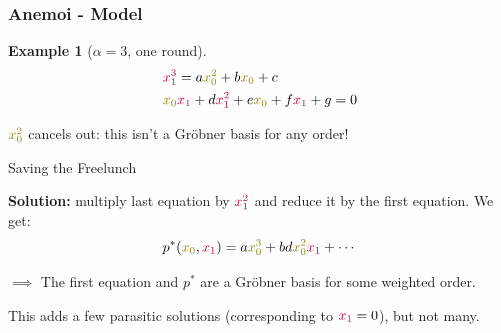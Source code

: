 \documentclass[aspectratio=169]{beamer}
\newtheorem{exemple}{Example}
\begin{document}
\begin{frame}
  \frametitle{Anemoi - Model}


  \begin{exemple}[$\alpha = 3$, one round]
    {\small
    \vspace{-20pt}
    \begin{align*}
      &\textcolor{purple}{x_1^3} = a\textcolor{olive}{x_0^2} + b\textcolor{olive}{x_0} + c \\
      &\textcolor{olive}{x_0}\textcolor{purple}{x_1} + d\textcolor{purple}{x_1^2} + e\textcolor{olive}{x_0} + f\textcolor{purple}{x_1} + g  = 0
    \end{align*}
    }
  \end{exemple}

    \pause

    $\textcolor{olive}{x_0^2}$ cancels out: this isn't a Gröbner basis for any order!

    \pause

    \begin{exampleblock}{Saving the Freelunch}
      {\small 
        \textbf{Solution:} multiply last equation by $\textcolor{purple}{x_1^2}$ and reduce it by the first equation. We get:
        \[ p^*(\textcolor{olive}{x_0}, \textcolor{purple}{x_1}) = a\textcolor{olive}{x_0^3} + bd\textcolor{olive}{x_0^2}\textcolor{purple}{x_1} + \cdots \] 

        \pause
        $\implies$ The first equation and $p^*$ are a Gröbner basis for some weighted order.

        \pause

        This adds a few parasitic solutions (corresponding to $\textcolor{purple}{x_1}=0$), but not many.
      }
    \end{exampleblock}
\end{frame}


  
\end{document}
